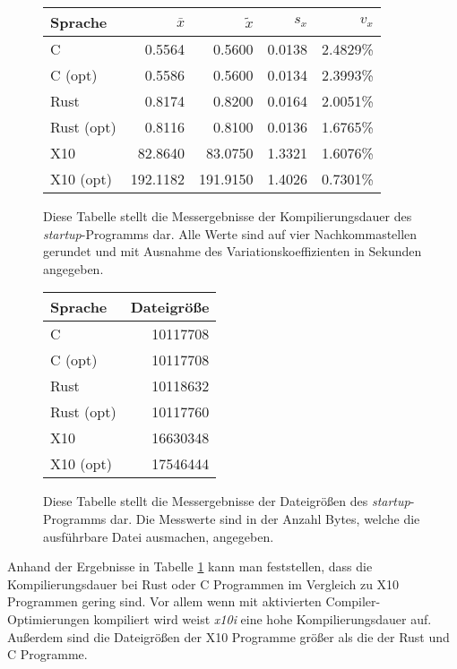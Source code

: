 \begin{figure}[hb]
	\begin{center}
		\begin{tabular}{lrrrr}
			\toprule
			Sprache    & $\bar{x}$ & $\tilde{x}$ & $s_x$ & $v_x$\\
			\midrule
			C          &   0.5564 &   0.5600 & 0.0138 & 2.4829\% \\
			C (opt)    &   0.5586 &   0.5600 & 0.0134 & 2.3993\% \\
			Rust       &   0.8174 &   0.8200 & 0.0164 & 2.0051\% \\
			Rust (opt) &   0.8116 &   0.8100 & 0.0136 & 1.6765\% \\
			X10        &  82.8640 &  83.0750 & 1.3321 & 1.6076\% \\
			X10 (opt)  & 192.1182 & 191.9150 & 1.4026 & 0.7301\% \\
			\bottomrule
		\end{tabular}
	\end{center}
	\caption{
		Diese Tabelle stellt die Messergebnisse der Kompilierungsdauer des \textit{startup}-Programms dar.
		Alle Werte sind auf vier Nachkommastellen gerundet und mit Ausnahme des Variationskoeffizienten
		in Sekunden angegeben.
	}
	\label{fig:compile_table}
\end{figure}

\begin{figure}[hb]
	\begin{center}
		\begin{tabular}{lr}
			\toprule
			Sprache & Dateigröße \\
			\midrule
			C          & 10117708 \\
			C (opt)    & 10117708 \\
			Rust       & 10118632 \\
			Rust (opt) & 10117760 \\
			X10        & 16630348 \\
			X10 (opt)  & 17546444 \\
			\bottomrule
		\end{tabular}
	\end{center}
	\caption{
		Diese Tabelle stellt die Messergebnisse der Dateigrößen des \textit{startup}-Programms dar.
		Die Messwerte sind in der Anzahl Bytes, welche die ausführbare Datei ausmachen, angegeben.
	}
	\label{fig:filesize_table}
\end{figure}

Anhand der Ergebnisse in Tabelle \ref{fig:compile_table} kann man feststellen,
dass die Kompilierungsdauer bei Rust oder C Programmen im Vergleich zu
X10 Programmen gering sind. 
Vor allem wenn mit aktivierten Compiler-Optimierungen kompiliert wird weist \textit{x10i} eine hohe
Kompilierungsdauer auf.
Außerdem sind die Dateigrößen der X10 Programme größer als die der Rust und C Programme.

